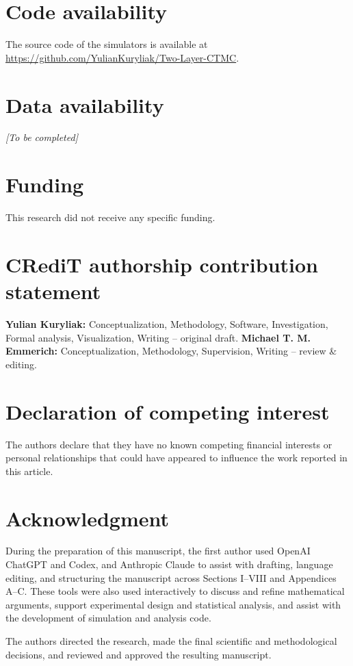 \documentclass{ieeeaccess}
\begin{document}
\section*{Code availability}
The source code of the simulators is available at
\url{https://github.com/YulianKuryliak/Two-Layer-CTMC}.

\section*{Data availability}
\textit{[To be completed]}

\section*{Funding}
This research did not receive any specific funding.

\section*{CRediT authorship contribution statement}

\textbf{Yulian Kuryliak:} Conceptualization, Methodology, Software,
Investigation, Formal analysis, Visualization, Writing -- original draft.
\textbf{Michael T. M. Emmerich:} Conceptualization, Methodology, Supervision,
Writing -- review \& editing.

\section*{Declaration of competing interest}
The authors declare that they have no known competing financial interests or
personal relationships that could have appeared to influence the work reported
in this article.

\section*{Acknowledgment}
During the preparation of this manuscript, the first author used OpenAI ChatGPT and Codex, and Anthropic Claude to assist with drafting, language editing, and structuring the manuscript across Sections I–VIII and Appendices A–C. These tools were also used interactively to discuss and refine mathematical arguments, support experimental design and statistical analysis, and assist with the development of simulation and analysis code.

The authors directed the research, made the final scientific and methodological decisions, and reviewed and approved the resulting manuscript.
\end{document}
